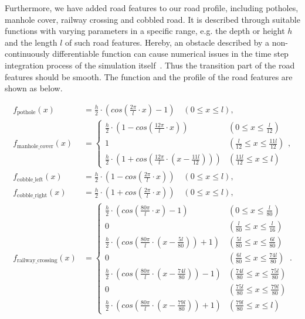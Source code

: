 Furthermore, we have added road features to our road profile, including potholes, manhole cover, railway crossing and cobbled road.
%
It is described through suitable functions with varying parameters in a specific range, e.g. the depth or height $h$ and the length $l$ of such road features.
%
Hereby, an obstacle described by a non-continuously differentiable function can cause numerical issues in the time step integration process of the simulation itself~\cite{frey2012development}.
%
Thus the transition part of the road features should be smooth. The function and the profile of the road features are shown as below.

\begin{align}
    f_\text{pothole}(x)&=\frac{h}{2}\cdot (cos(\frac{2\pi}{l} \cdot x)-1) \quad (0\leq x \leq l),
    \\
f_\text{manhole\_cover}(x)&=
\begin{cases}
    \frac{h}{2}\cdot (1-cos(\frac{12 \pi}{l}\cdot x))  & (0\leq x \leq \frac{l}{12}) \\
    1              & (\frac{l}{12} \leq x \leq \frac{11l}{12}) \\
    \frac{h}{2}\cdot (1+cos(\frac{12 \pi}{l}\cdot (x-\frac{11l}{12})))  & (\frac{11l}{12} \leq x \leq l)
\end{cases},
\\
    f_\text{cobble\_left}(x) &=\frac{h}{2}\cdot (1-cos(\frac{2\pi}{l} \cdot x)) \quad (0\leq x \leq l), \\
    f_\text{cobble\_right}(x)&=\frac{h}{2}\cdot (1+cos(\frac{2\pi}{l} \cdot x)) \quad (0\leq x \leq l),
\\
f_\text{railway\_crossing}(x) &=
\begin{cases}
    \frac{h}{2}\cdot (cos(\frac{80 \pi}{l}\cdot x)-1) & (0\leq x \leq \frac{l}{80}) \\
    0             & (\frac{l}{80} \leq x \leq \frac{l}{16}) \\
    \frac{h}{2}\cdot (cos(\frac{80 \pi}{l}\cdot (x-\frac{5l}{80}))+1) & (\frac{5l}{80} \leq x \leq \frac{6l}{80}) \\
    0             & (\frac{6l}{80} \leq x \leq \frac{74l}{80}) \\
    \frac{h}{2}\cdot (cos(\frac{80 \pi}{l}\cdot (x-\frac{74l}{80}))-1) & (\frac{74l}{80} \leq x \leq \frac{75l}{80}) \\
    0             & (\frac{75l}{80} \leq x \leq \frac{79l}{80}) \\
    \frac{h}{2}\cdot (cos(\frac{80 \pi}{l}\cdot (x-\frac{79l}{80}))+1) & (\frac{79l}{80} \leq x \leq l)
\end{cases}.
\end{align}



